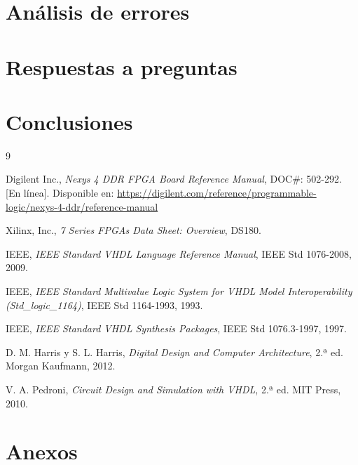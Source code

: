 \documentclass[letterpaper,12pt]{article}
\begin{document}
\section{Análisis de errores}

\section{Respuestas a preguntas}

\section{Conclusiones}

\newpage
\begin{thebibliography}{9}

Digilent Inc., \emph{Nexys 4 DDR FPGA Board Reference Manual}, DOC\#: 502-292. [En línea]. Disponible en: \url{https://digilent.com/reference/programmable-logic/nexys-4-ddr/reference-manual}

Xilinx, Inc., \emph{7 Series FPGAs Data Sheet: Overview}, DS180.

IEEE, \emph{IEEE Standard VHDL Language Reference Manual}, IEEE Std 1076-2008, 2009.

IEEE, \emph{IEEE Standard Multivalue Logic System for VHDL Model Interoperability (Std\_logic\_1164)}, IEEE Std 1164-1993, 1993.

IEEE, \emph{IEEE Standard VHDL Synthesis Packages}, IEEE Std 1076.3-1997, 1997.

D. M. Harris y S. L. Harris, \emph{Digital Design and Computer Architecture}, 2.ª ed. Morgan Kaufmann, 2012.

V. A. Pedroni, \emph{Circuit Design and Simulation with VHDL}, 2.ª ed. MIT Press, 2010.

\end{thebibliography}

\newpage
\section{Anexos}
\end{document}
